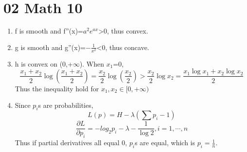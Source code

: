\documentclass[10pt, oneside]{article}
\begin{document}
\section{02 Math 10}
\begin{enumerate}
	\item f is smooth and f''(x)=$a^2e^{ax}$>0, thus convex.
	\item g is smooth and g''(x)=$-\frac{1}{x^2}$<0, thus concave.
	\item h is convex on (0,+$\infty$). When $x_1$=0, $$
	\frac{x_1+x_2}{2}\log(\frac{x_1+x_2}{2})=\frac{x_2}{2}\log(\frac{x_2}{2})>\frac{x_2}{2}\log x_2=\frac{x_1\log x_1 +x_2 \log x_2}{2}
	$$
	Thus the inequality hold for $x_1, x_2\in [0,+\infty)$
	\item Since $p_i$s are probabilities, $$
	L(p)=H-\lambda(\sum p_i-1)$$
	$$
	\frac{\partial L}{\partial p_i}=-log_2p_i -\lambda-\frac{1}{\log 2}, i=1,\cdots, n
	$$
	Thus if partial derivatives all equal 0, $p_i$s are equal, which is $p_i=\frac{1}{n}$.
\end{enumerate}
\end{document}
